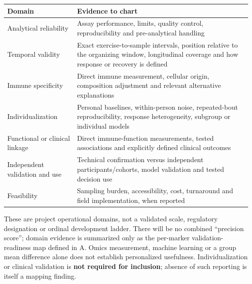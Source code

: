 \documentclass[
  11pt,
  a4paper,
]{article}
\newcounter{none} %
\begin{document}
{\def\LTcaptype{none} %
\begin{longtable}[]{@{}
  >{\raggedright\arraybackslash}p{}
  >{\raggedright\arraybackslash}p{}@{}}
\toprule\noalign{}
\begin{minipage}[b]{\linewidth}\raggedright
Domain
\end{minipage} & \begin{minipage}[b]{\linewidth}\raggedright
Evidence to chart
\end{minipage} \\
\midrule\noalign{}
\endhead
\bottomrule\noalign{}
\endlastfoot
Analytical reliability & Assay performance, limits, quality control,
reproducibility and pre-analytical handling \\
Temporal validity & Exact exercise-to-sample intervals, position
relative to the organizing window, longitudinal coverage and how
response or recovery is defined \\
Immune specificity & Direct immune measurement, cellular origin,
composition adjustment and relevant alternative explanations \\
Individualization & Personal baselines, within-person noise,
repeated-bout reproducibility, response heterogeneity, subgroup or
individual models \\
Functional or clinical linkage & Direct immune-function measurements,
tested associations and explicitly defined clinical outcomes \\
Independent validation and use & Technical confirmation versus
independent participants/cohorts, model validation and tested decision
use \\
Feasibility & Sampling burden, accessibility, cost, turnaround and field
implementation, when reported \\
\end{longtable}
}

These are project operational domains, not a validated scale, regulatory
designation or ordinal development ladder. There will be no combined
``precision score''; domain evidence is summarized only as the
per-marker validation-readiness map defined in A. Omics measurement,
machine learning or a group mean difference alone does not establish
personalized usefulness. Individualization or clinical validation is
\textbf{not required for inclusion}; absence of such reporting is itself
a mapping finding.
\end{document}
